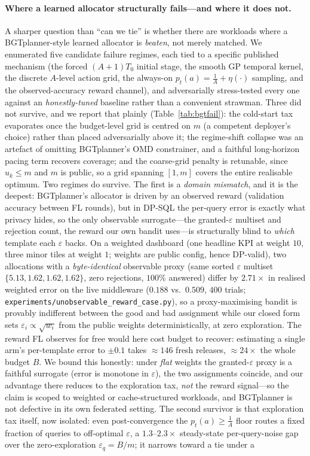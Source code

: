\documentclass[sigconf,nonacm]{acmart}
\newcommand{\eps}{\varepsilon}
\begin{document}
\paragraph{Where a learned allocator structurally fails---and where it does not.}
A sharper question than ``can we tie'' is whether there are workloads where a BGTplanner-style learned allocator is \emph{beaten}, not merely matched. We enumerated five candidate failure regimes, each tied to a specific published mechanism (the forced $(A{+}1)T_0$ initial stage, the smooth GP temporal kernel, the discrete $A$-level action grid, the always-on $p_t(a)=\frac1A+\eta(\cdot)$ sampling, and the observed-accuracy reward channel), and adversarially stress-tested every one against an \emph{honestly-tuned} baseline rather than a convenient strawman. Three did not survive, and we report that plainly (Table~\ref{tab:bgtfail}): the cold-start tax evaporates once the budget-level grid is centred on $m$ (a competent deployer's choice) rather than placed adversarially above it; the regime-shift collapse was an artefact of omitting BGTplanner's OMD constrainer, and a faithful long-horizon pacing term recovers coverage; and the coarse-grid penalty is retunable, since $u_k\le m$ and $m$ is public, so a grid spanning $[1,m]$ covers the entire realisable optimum. Two regimes do survive. The first is a \emph{domain mismatch}, and it is the deepest: BGTplanner's allocator is driven by an observed reward (validation accuracy between FL rounds), but in DP-SQL the per-query error is exactly what privacy hides, so the only observable surrogate---the granted-$\eps$ multiset and rejection count, the reward our own bandit uses---is structurally blind to \emph{which} template each $\eps$ backs. On a weighted dashboard (one headline KPI at weight $10$, three minor tiles at weight $1$; weights are public config, hence DP-valid), two allocations with a \emph{byte-identical} observable proxy (same sorted $\eps$ multiset $\{5.13,1.62,1.62,1.62\}$, zero rejections, $100\%$ answered) differ by $2.71\times$ in realised weighted error on the live middleware ($0.188$ vs.\ $0.509$, $400$ trials; \texttt{experiments/unobservable\_reward\_case.py}), so a proxy-maximising bandit is provably indifferent between the good and bad assignment while our closed form sets $\eps_i\propto\sqrt{w_i}$ from the public weights deterministically, at zero exploration. The reward FL observes for free would here cost budget to recover: estimating a single arm's per-template error to $\pm0.1$ takes ${\approx}146$ fresh releases, ${\approx}24\times$ the whole budget $B$. We bound this honestly: under \emph{flat} weights the granted-$\eps$ proxy is a faithful surrogate (error is monotone in $\eps$), the two assignments coincide, and our advantage there reduces to the exploration tax, \emph{not} the reward signal---so the claim is scoped to weighted or cache-structured workloads, and BGTplanner is not defective in its own federated setting. The second survivor is that exploration tax itself, now isolated: even post-convergence the $p_t(a)\ge\frac1A$ floor routes a fixed fraction of queries to off-optimal $\eps$, a $1.3$--$2.3\times$ steady-state per-query-noise gap over the zero-exploration $\eps_q=B/m$; it narrows toward a tie under a 
\end{document}
